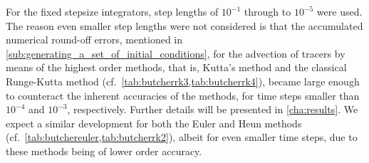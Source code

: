 For the fixed stepsize integrators, step lengths of $10^{-1}$ through to
$10^{-5}$ were used. The reason even smaller step lengths were not considered
is that the accumulated numerical round-off errors, mentioned in
\cref{sub:generating_a_set_of_initial_conditions}, for the advection
of tracers by means of the highest order methods, that is, Kutta's method and
the classical Runge-Kutta method (cf.\ \cref{tab:butcherrk3,tab:butcherrk4}),
became large enough to counteract the inherent accuracies of the methods,
for time steps smaller than $10^{-4}$ and $10^{-3}$, respectively. Further
details will be presented in \cref{cha:results}. We expect a similar development
for both the Euler and Heun methods (cf.\
\cref{tab:butchereuler,tab:butcherrk2}), albeit for even smaller time steps,
due to these methods being of lower order accuracy.
%
%
%

